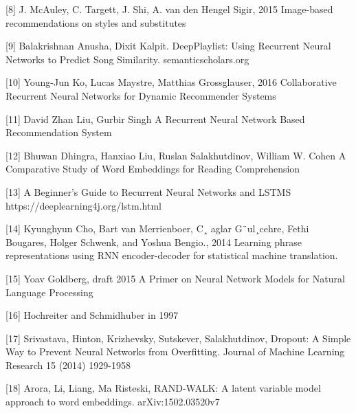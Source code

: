 \documentclass[10pt, twocolumn, letterpaper]{article}
\begin{document}
[8] J. McAuley, C. Targett, J. Shi, A. van den Hengel Sigir, 2015
Image-based recommendations on styles and substitutes

[9] Balakrishnan Anusha, Dixit Kalpit.
DeepPlaylist: Using Recurrent Neural Networks to Predict Song Similarity. semanticscholars.org

[10] Young-Jun Ko, Lucas Maystre, Matthias Grossglauser, 2016
Collaborative Recurrent Neural Networks for Dynamic Recommender Systems

[11] David Zhan Liu, Gurbir Singh
A Recurrent Neural Network Based Recommendation System

[12] Bhuwan Dhingra, Hanxiao Liu, Ruslan Salakhutdinov, William W. Cohen
A Comparative Study of Word Embeddings for Reading Comprehension

[13] A Beginner's Guide to Recurrent Neural Networks and LSTMS
https://deeplearning4j.org/lstm.html

[14] Kyunghyun Cho, Bart van Merrienboer, C¸ aglar G¨ul¸cehre, Fethi Bougares, Holger Schwenk, and Yoshua Bengio., 2014
Learning phrase representations using RNN encoder-decoder for statistical machine translation.

[15] Yoav Goldberg, draft 2015
A Primer on Neural Network Models for Natural Language Processing

[16] Hochreiter and Schmidhuber in 1997

[17] Srivastava, Hinton, Krizhevsky, Sutskever, Salakhutdinov, Dropout: A Simple Way to Prevent Neural Networks from Overfitting. Journal of Machine Learning Research 15 (2014) 1929-1958

[18] Arora, Li, Liang, Ma Risteski, RAND-WALK: A latent variable model approach to word embeddings. arXiv:1502.03520v7
\end{document}
